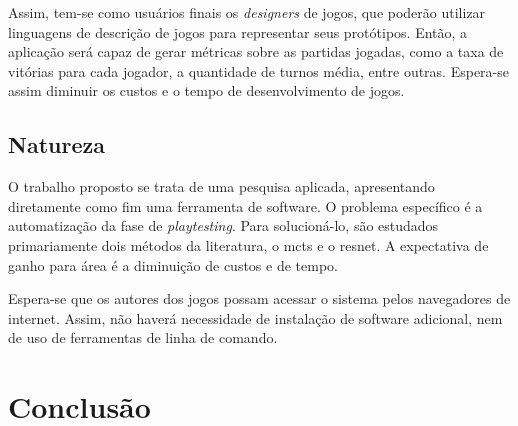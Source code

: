 \documentclass[12pt]{article}
\begin{document}
Assim, tem-se como usuários finais os \textit{designers} de jogos, que poderão utilizar linguagens de descrição de jogos para representar seus protótipos.
Então, a aplicação será capaz de gerar métricas sobre as partidas jogadas, como a taxa de vitórias para cada jogador, a quantidade de turnos média, entre outras.
Espera-se assim diminuir os custos e o tempo de desenvolvimento de jogos.

\subsection{Natureza}

O trabalho proposto se trata de uma pesquisa aplicada, apresentando diretamente como fim uma ferramenta de software.
O problema específico é a automatização da fase de \textit{playtesting}.
Para solucioná-lo, são estudados primariamente dois métodos da literatura, o \gls{mcts} e o \gls{resnet}.
A expectativa de ganho para área é a diminuição de custos e de tempo.

Espera-se que os autores dos jogos possam acessar o sistema pelos navegadores de internet.
Assim, não haverá necessidade de instalação de software adicional, nem de uso de ferramentas de linha de comando.




\section{Conclusão}%
\label{sec:conclusao}


\printbibliography{}
\end{document}

